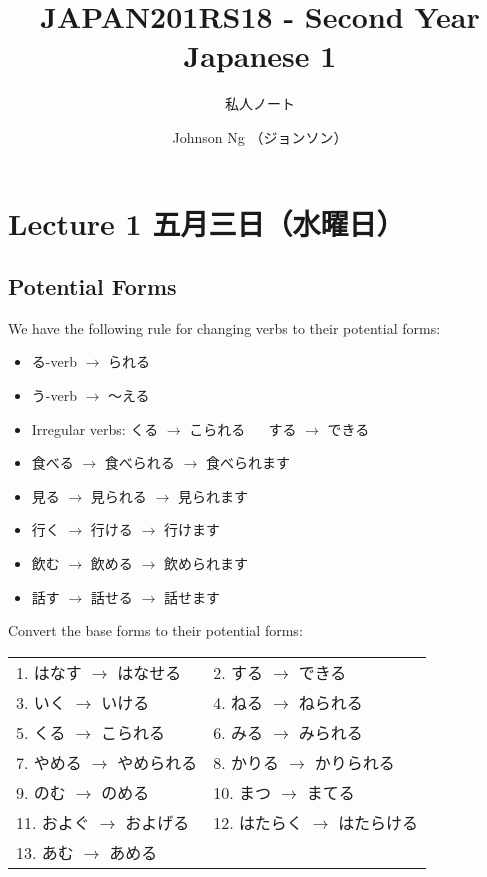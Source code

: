 \documentclass[notoc,notitlepage]{tufte-book}
\title{JAPAN201RS18 - Second Year Japanese 1}
\author{Johnson Ng （ジョンソン）}
\subtitle{私人ノート}
\begin{document}
\hypersetup{pageanchor=false}
\maketitle
\hypersetup{pageanchor=true}
\tableofcontents

\chapter{Lecture 1 五月三日（水曜日）}
  \label{chapter:lecture_1_may_03rd_2018}

\section{Potential Forms} %
\label{sec:potential_forms}

We have the following rule for changing verbs to their potential forms:
\begin{itemize}
  \item る-verb $\to$ られる 
  \item う-verb $\to$ 〜える 
  \item Irregular verbs: くる $\to$ こられる $\quad$ する $\to$ できる
\end{itemize}

\begin{eg}
  \begin{itemize}
    \item 食べる $\to$ 食べられる $\to$ 食べられます
    \item 見る $\to$ 見られる $\to$ 見られます
  \end{itemize}
  
\noindent{}
  \begin{itemize}
    \item 行く $\to$ 行ける $\to$ 行けます
    \item 飲む $\to$ 飲める $\to$ 飲められます
    \item 話す $\to$ 話せる $\to$ 話せます
  \end{itemize}
\end{eg}

\begin{ex}
Convert the base forms to their potential forms:  \\
  \begin{tabular}{l l}
    1. はなす $\to$ はなせる   & 2. する $\to$ できる \\
    3. いく $\to$ いける       & 4. ねる $\to$ ねられる \\
    5. くる $\to$ こられる     & 6. みる $\to$ みられる \\
    7. やめる $\to$ やめられる & 8. かりる $\to$ かりられる \\
    9. のむ $\to$ のめる       & 10. まつ $\to$ まてる \\
    11. およぐ $\to$ およげる  & 12. はたらく $\to$ はたらける \\
    13. あむ $\to$ あめる
  \end{tabular}
\end{ex}
\end{document}
